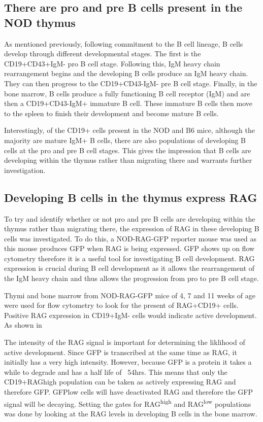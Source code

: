 \subsection{There are pro and pre B cells present in the NOD thymus}


As mentioned previously, following commitment to the B cell lineage, B cells develop through different developmental stages.
The first is the CD19+CD43+IgM- pro B cell stage.
Following this, IgM heavy chain rearrangement begins and the developing B cells produce an IgM heavy chain. 
They can then progress to the CD19+CD43-IgM- pre B cell stage.
Finally, in the bone marrow, B cells produce a fully functioning B cell receptor (IgM) and are then a CD19+CD43-IgM+ immature B cell.
These immature B cells then move to the spleen to finish their development and become mature B cells.

Interestingly, of the CD19+ cells present in the NOD and B6 mice, although the majority are mature IgM+ B cells, there are also populations of developing B cells at the pro and pre B cell stages.
This gives the impression that B cells are developing within the thymus rather than migrating there and warrants further investigation. 



\subsection{Developing B cells in the thymus express RAG}


To try and identify whether or not pro and pre B cells are developing within the thymus rather than migrating there, the expression of RAG in these developing B cells was investigated.
To do this, a NOD-RAG-GFP reporter mouse was used as this mouse produces GFP when RAG is being expressed.
GFP shows up on flow cytometry therefore it is a useful tool for investigating B cell development.
RAG expression is crucial during B cell development as it allows the rearrangement of the IgM heavy chain and thus allows the progression from pro to pre B cell stage.

Thymi and bone marrow from NOD-RAG-GFP mice of 4, 7 and 11 weeks of age were used for flow cytometry to look for the present of RAG+CD19+ cells.
Positive RAG expression in CD19+IgM- cells would indicate active development.
As shown in 

The intensity of the RAG signal is important for determining the liklihood of active development.
Since GFP is transcribed at the same time as RAG, it initially has a very high intensity.
However, because GFP is a protein it takes a while to degrade and has a half life of ~54hrs.
This means that only the CD19+RAGhigh population can be taken as actively expressing RAG and therefore GFP.
GFPlow cells will have deactivated RAG and therefore the GFP signal will be decaying.
Setting the gates for RAG\textsuperscript{high} and RAG\textsuperscript{low} populations was done by looking at the RAG levels in developing B cells in the bone marrow.

